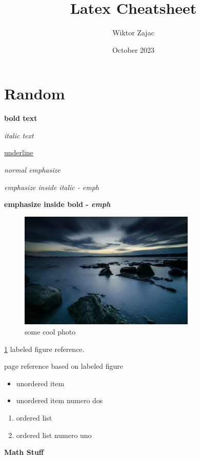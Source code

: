 \documentclass[12pt, a4paper]{article} %
\title{Latex Cheatsheet}
\author{Wiktor Zajac}
\date{October 2023}
\begin{document}
\maketitle
\vspace{5mm}

\section{Random}

\textbf{bold text}

\textit{italic text}

\underline{underline}

\emph{normal emphasize}

\textit{emphasize inside italic - \emph{emph}}

\textbf{emphasize inside bold - \emph{emph}}


\begin{figure}[h]
	\centering
	\includegraphics[width=0.75\textwidth]{image}
	\caption{some cool photo}
	\label{fig:image}
\end{figure}


\ref{fig:image} labeled figure reference.

\pageref{fig:image} page reference based on labeled figure

\begin{itemize}
	\item unordered item
	\item unordered item numero dos
\end{itemize}

\begin{enumerate}
	\item ordered list
	\item ordered list numero uno
\end{enumerate}

\textbf{Math Stuff}
\end{document}

